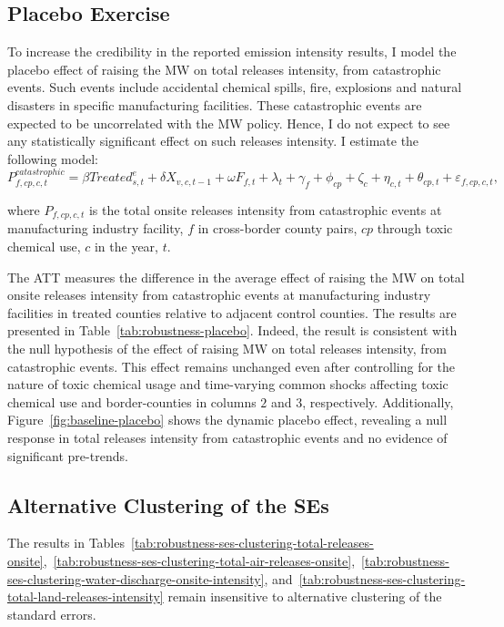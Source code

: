 \documentclass{C:/Users/david/OneDrive/Documents/ULMS/PhD/Thesis/chapter3/src/climate_change/latex/Economic_Journal/OUP-EJ}
\begin{document}
    \subsection{Placebo Exercise}\label{subsec:placebo-exercise}
    To increase the credibility in the reported emission intensity results, I model the placebo effect of raising the MW on total releases intensity, from catastrophic events. Such events include accidental chemical spills, fire, explosions and natural disasters in specific manufacturing facilities. These catastrophic events are expected to be uncorrelated with the MW policy. Hence, I do not expect to see any statistically significant effect on such releases intensity. I estimate the following model:
    \begin{equation}
        P_{f,cp,c,t}^{catastrophic} = \beta Treated_{s,t}^e + \delta X_{v,c,t-1} + \omega F_{f,t} + \lambda_{t} + \gamma_{f} + \phi_{cp} + \zeta_{c} + \eta_{c,t} + \theta_{cp,t} + \varepsilon_{f,cp,c,t},\label{eq:robustness-placebo}
    \end{equation}
    

    where $P_{f,cp,c,t}$ is the total onsite releases intensity from catastrophic events at manufacturing industry facility, $f$ in cross-border county pairs, $cp$ through toxic chemical use, $c$ in the year, $t$.

    The ATT measures the difference in the average effect of raising the MW on total onsite releases intensity from catastrophic events at manufacturing industry facilities in treated counties relative to adjacent control counties. The results are presented in Table~\ref{tab:robustness-placebo}. Indeed, the result is consistent with the null hypothesis of the effect of raising MW on total releases intensity, from catastrophic events. This effect remains unchanged even after controlling for the nature of toxic chemical usage and time-varying common shocks affecting toxic chemical use and border-counties in columns $2$ and $3$, respectively. Additionally, Figure~\ref{fig:baseline-placebo} shows the dynamic placebo effect, revealing a null response in total releases intensity from catastrophic events and no evidence of significant pre-trends.
    

    \subsection{Alternative Clustering of the SEs}\label{subsec:alternative-clustering-of-the-ses}
    The results in Tables~\ref{tab:robustness-ses-clustering-total-releases-onsite},~\ref{tab:robustness-ses-clustering-total-air-releases-onsite},~\ref{tab:robustness-ses-clustering-water-discharge-onsite-intensity}, and~\ref{tab:robustness-ses-clustering-total-land-releases-intensity} remain insensitive to alternative clustering of the standard errors.
    
    
    
    
\end{document}
